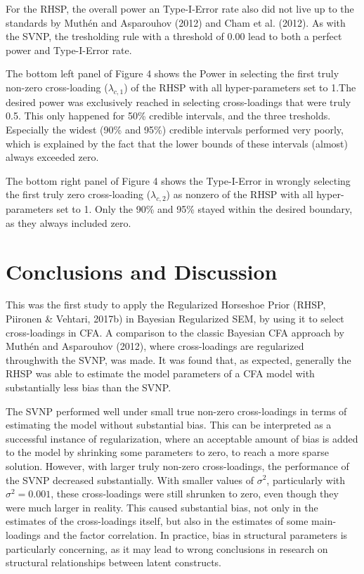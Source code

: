 \documentclass[
  man, donotrepeattitle,floatsintext]{apa6}
\begin{document}
For the RHSP, the overall power an Type-I-Error rate also did not live up to the standards by Muthén and Asparouhov (2012) and Cham et al. (2012). As with the SVNP, the tresholding rule with a threshold of 0.00 lead to both a perfect power and Type-I-Error rate.

The bottom left panel of Figure 4 shows the Power in selecting the first truly non-zero cross-loading (\(\lambda_{c,1}\)) of the RHSP with all hyper-parameters set to 1.The desired power was exclusively reached in selecting cross-loadings that were truly 0.5. This only happened for 50\% credible intervals, and the three tresholds. Especially the widest (90\% and 95\%) credible intervals performed very poorly, which is explained by the fact that the lower bounds of these intervals (almost) always exceeded zero.

The bottom right panel of Figure 4 shows the Type-I-Error in wrongly selecting the first truly zero cross-loading (\(\lambda_{c,2}\)) as nonzero of the RHSP with all hyper-parameters set to 1. Only the 90\% and 95\% stayed within the desired boundary, as they always included zero.

\hypertarget{conclusions-and-discussion}{%
\section{Conclusions and Discussion}\label{conclusions-and-discussion}}

This was the first study to apply the Regularized Horseshoe Prior (RHSP, Piironen \& Vehtari, 2017b) in Bayesian Regularized SEM, by using it to select cross-loadings in CFA. A comparison to the classic Bayesian CFA approach by Muthén and Asparouhov (2012), where cross-loadings are regularized throughwith the SVNP, was made. It was found that, as expected, generally the RHSP was able to estimate the model parameters of a CFA model with substantially less bias than the SVNP.

The SVNP performed well under small true non-zero cross-loadings in terms of estimating the model without substantial bias. This can be interpreted as a successful instance of regularization, where an acceptable amount of bias is added to the model by shrinking some parameters to zero, to reach a more sparse solution. However, with larger truly non-zero cross-loadings, the performance of the SVNP decreased substantially. With smaller values of \(\sigma^2\), particularly with \(\sigma^2 = 0.001\), these cross-loadings were still shrunken to zero, even though they were much larger in reality. This caused substantial bias, not only in the estimates of the cross-loadings itself, but also in the estimates of some main-loadings and the factor correlation. In practice, bias in structural parameters is particularly concerning, as it may lead to wrong conclusions in research on structural relationships between latent constructs.
\end{document}
